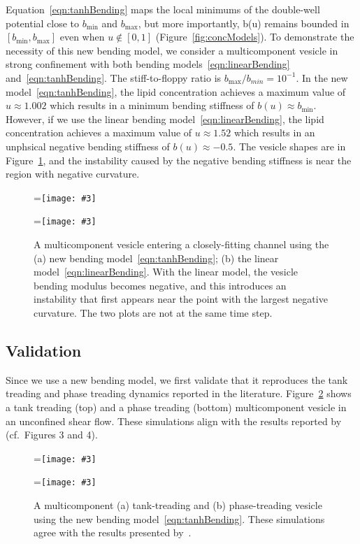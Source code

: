 \documentclass[twoside,twocolumn,9pt]{article}
\newcommand{\subfigimg}[3][,]{%
  \setbox1=\hbox{\texttt{[image: \#3]}}%
  \leavevmode\rlap{\usebox1}%
  \rlap{\hspace*{0pt}\raisebox{\dimexpr\ht1-0\baselineskip}{\bf
  \normalsize #2}}%
  \phantom{\usebox1}%
}
\begin{document}
Equation~\eqref{eqn:tanhBending} maps the local minimums of the double-well potential close to $b_{\min}$ and $b_{\max}$, but more importantly, b(u) remains bounded in $[b_{\min},b_{\max}]$ even when $u \notin [0,1]$ (Figure~\ref{fig:concModels}). To demonstrate the necessity of this new bending model, we consider a multicomponent vesicle in strong confinement with both bending models~\eqref{eqn:linearBending} and~\eqref{eqn:tanhBending}. The stiff-to-floppy ratio is $b_{\max}/b_{min} = 10^{-1}$. In the new model~\eqref{eqn:tanhBending}, the lipid concentration achieves a maximum value of $u \approx 1.002$ which results in a  minimum bending stiffness of $b(u) \approx b_{\min}$. However, if we use the linear bending model~\eqref{eqn:linearBending}, the lipid concentration achieves a maximum value of $u \approx 1.52$ which results in an unphsical negative bending stiffness of $b(u) \approx -0.5$. The vesicle shapes are in Figure~\ref{fig:bendingModels}, and the instability caused by the negative bending stiffness is near the region with negative curvature.
\begin{figure}[htp]
    \centering
        \subfigimg[width=0.48\linewidth, clip ]{(a)}{figures/newbending.pdf}
        \subfigimg[width=0.48\linewidth, clip ]{(b)}{figures/oldbending.pdf}
    \caption{\label{fig:bendingModels} \small A multicomponent vesicle entering a closely-fitting channel using the (a) new bending model~\eqref{eqn:tanhBending}; (b) the linear model~\eqref{eqn:linearBending}. With the linear model, the vesicle bending modulus becomes negative, and this introduces an instability that first appears near the point with the largest negative curvature. The two plots are not at the same time step.}
\end{figure}

\subsection{Validation}
Since we use a new bending model, we first validate that it reproduces the tank treading and phase treading dynamics reported in the literature. Figure~\ref{fig:treading} shows a tank treading (top) and a phase treading (bottom) multicomponent vesicle in an unconfined shear flow. These simulations align with the results reported by~\citet{liu-mar-li-vee-low2017} (cf.~Figures 3 and 4).
\begin{figure}[H]
    \centering
    \subfigimg[width=\columnwidth, trim ={5.5cm 1.5cm 4cm 0},clip]{(a)}{figures/Fig4a.pdf}
    \subfigimg[width=\columnwidth, trim ={5.5cm 1.5cm 4cm 0},clip]{(b)}{figures/Fig4b.pdf}
    \caption{\label{fig:treading} \small A multicomponent (a) tank-treading and (b) phase-treading vesicle using the new bending model~\eqref{eqn:tanhBending}. These simulations agree with the results presented by~\citet{liu-mar-li-vee-low2017}.}
\end{figure}
\end{document}
